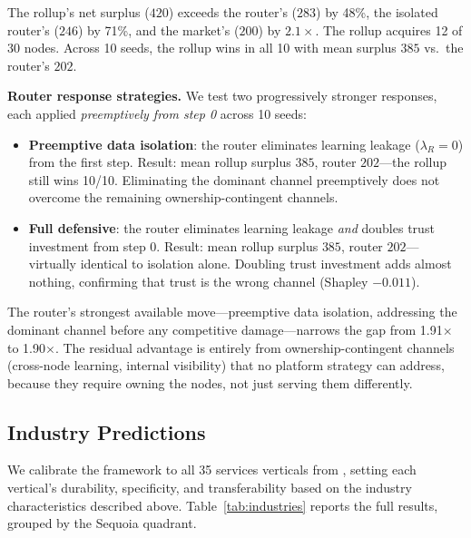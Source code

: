 \documentclass[12pt]{article}
\theoremstyle{definition}
\begin{document}
The rollup's net surplus ($420$) exceeds the router's ($283$) by 48\%, the isolated router's ($246$) by 71\%, and the market's ($200$) by $2.1\times$. The rollup acquires 12 of 30 nodes. Across 10 seeds, the rollup wins in all 10 with mean surplus $385$ vs.\ the router's $202$.

\textbf{Router response strategies.} We test two progressively stronger responses, each applied \textit{preemptively from step 0} across 10 seeds:

\begin{itemize}[leftmargin=*]
\item \textbf{Preemptive data isolation}: the router eliminates learning leakage ($\lambda_R = 0$) from the first step. Result: mean rollup surplus $385$, router $202$---the rollup still wins 10/10. Eliminating the dominant channel preemptively does not overcome the remaining ownership-contingent channels.

\item \textbf{Full defensive}: the router eliminates learning leakage \textit{and} doubles trust investment from step 0. Result: mean rollup surplus $385$, router $202$---virtually identical to isolation alone. Doubling trust investment adds almost nothing, confirming that trust is the wrong channel (Shapley $-0.011$).
\end{itemize}

\noindent The router's strongest available move---preemptive data isolation, addressing the dominant channel before any competitive damage---narrows the gap from 1.91$\times$ to 1.90$\times$. The residual advantage is entirely from ownership-contingent channels (cross-node learning, internal visibility) that no platform strategy can address, because they require owning the nodes, not just serving them differently.

\subsection{Industry Predictions}
\label{sec:industries}

We calibrate the framework to all 35 services verticals from \citet{sequoia2025services}, setting each vertical's durability, specificity, and transferability based on the industry characteristics described above. Table~\ref{tab:industries} reports the full results, grouped by the Sequoia quadrant.
\end{document}
